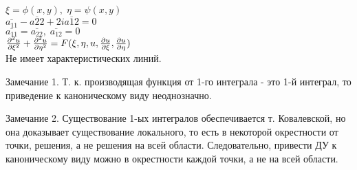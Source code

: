 \documentclass[../main.tex]{subfiles}
\begin{document}
$\xi = \phi(x,y),\; \eta = \psi(x,y)$ \\
$\overline{a_{11}} - \overline{a{22}} + 2i\overline{a{12}} = 0$ \\
$\overline{a_{11}}=\overline{a_{22}}, \; \overline{a_{12}}=0$ \\
$\frac{\partial^2u}{\partial{\xi^2}} + \frac{\partial^2u}{\partial{\eta^2}} = F(\xi, \eta, u, \frac{\partial u}{\partial \xi}, \frac{\partial u}{\partial \eta})$ \\
Не имеет характеристических линий.
\par Замечание 1. Т. к. производящая функция от 1-го интеграла - это 1-й интеграл, то приведение к каноническому виду неоднозначно.
\par Замечание 2. Существование 1-ых интегралов обеспечивается т. Ковалевской, но она доказывает существование локального, то есть в некоторой окрестности от точки, решения, а не решения на всей области. Следовательно, привести ДУ к каноническому виду можно в окрестности каждой точки, а не на всей области.
\end{document}

